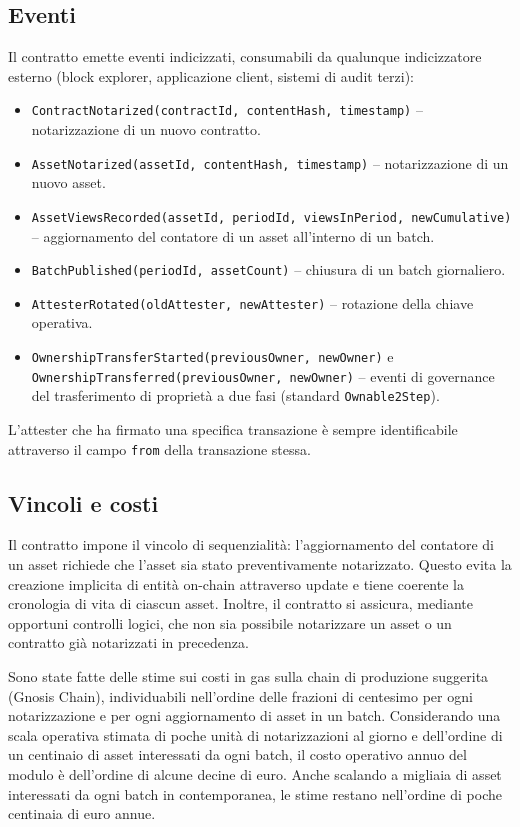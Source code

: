 \documentclass[a4paper,11pt]{article}
\begin{document}
\subsection{Eventi}

Il contratto emette eventi indicizzati, consumabili da qualunque indicizzatore esterno (block explorer, applicazione client, sistemi di audit terzi):

\begin{itemize}[leftmargin=*, itemsep=0.1em]
    \item \texttt{ContractNotarized(contractId, contentHash, timestamp)} -- notarizzazione di un nuovo contratto.
    \item \texttt{AssetNotarized(assetId, contentHash, timestamp)} -- notarizzazione di un nuovo asset.
    \item \texttt{AssetViewsRecorded(assetId, periodId, viewsInPeriod, newCumulative)} -- aggiornamento del contatore di un asset all'interno di un batch.
    \item \texttt{BatchPublished(periodId, assetCount)} -- chiusura di un batch giornaliero.
    \item \texttt{AttesterRotated(oldAttester, newAttester)} -- rotazione della chiave operativa.
    \item \texttt{OwnershipTransferStarted(previousOwner, newOwner)} e \texttt{OwnershipTransferred(previousOwner, newOwner)} -- eventi di governance del trasferimento di propriet\`a a due fasi (standard \texttt{Ownable2Step}).
\end{itemize}

\noindent L'attester che ha firmato una specifica transazione \`e sempre identificabile attraverso il campo \texttt{from} della transazione stessa.

\subsection{Vincoli e costi}

Il contratto impone il vincolo di sequenzialit\`a: l'aggiornamento del contatore di un asset richiede che l'asset sia stato preventivamente notarizzato. Questo evita la creazione implicita di entit\`a on-chain attraverso update e tiene coerente la cronologia di vita di ciascun asset. Inoltre, il contratto si assicura, mediante opportuni controlli logici, che non sia possibile notarizzare un asset o un contratto già notarizzati in precedenza.

Sono state fatte delle stime sui costi in gas sulla chain di produzione suggerita (Gnosis Chain), individuabili nell'ordine delle frazioni di centesimo per ogni notarizzazione e per ogni aggiornamento di asset in un batch. Considerando una scala operativa stimata di poche unit\`a di notarizzazioni al giorno e dell'ordine di un centinaio di asset interessati da ogni batch, il costo operativo annuo del modulo \`e dell'ordine di alcune decine di euro. Anche scalando a migliaia di asset interessati da ogni batch in contemporanea, le stime restano nell'ordine di poche centinaia di euro annue.
\end{document}
